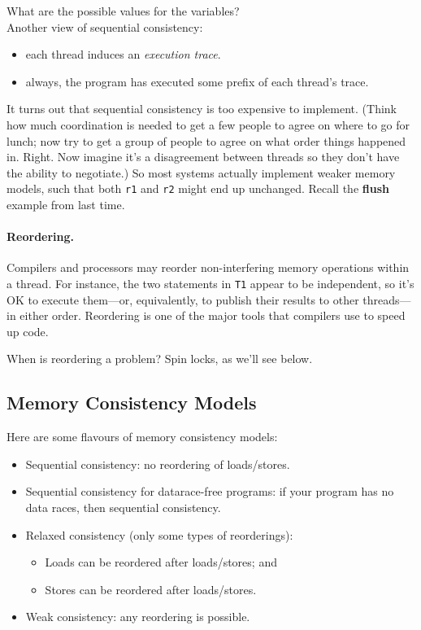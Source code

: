 \documentclass[a4paper]{report}
\begin{document}
{\sf What are the possible values for the variables?}\\[3em]

Another view of sequential consistency:
\begin{itemize}
      \item each thread induces an \emph{execution trace}.
      \item always, the program has executed some prefix of each thread's
        trace.
\end{itemize}


It turns out that sequential consistency is too expensive to implement.
(Think how much coordination is needed to get a few people to agree on where to go for lunch; now try to get a group of people to agree on what order things happened in. Right. Now imagine it's a disagreement between threads so they don't have the ability to negotiate.) So most systems actually implement weaker memory models,
such that both {\tt r1} and {\tt r2} might end up unchanged. Recall the 
{\bf flush} example from last time.

\paragraph{Reordering.} Compilers and processors may reorder 
non-interfering memory operations within a thread. For instance, the
two statements in {\tt T1} appear to be independent, so it's OK to
execute them---or, equivalently, to publish their results to other
threads---in either order. Reordering is one of the major tools that
compilers use to speed up code.

When is reordering a problem? Spin locks, as we'll see below.

\subsection*{Memory Consistency Models}

Here are some flavours of memory consistency models:

\begin{itemize}
\item Sequential consistency: no reordering of loads/stores.
\item Sequential consistency for datarace-free programs: if your program
  has no data races, then sequential consistency.
\item Relaxed consistency (only some types of reorderings):
\begin{itemize}
        \item Loads can be reordered after loads/stores; and
        \item Stores can be reordered after loads/stores.
\end{itemize}
\item     Weak consistency: any reordering is possible.
\end{itemize}
\end{document}
